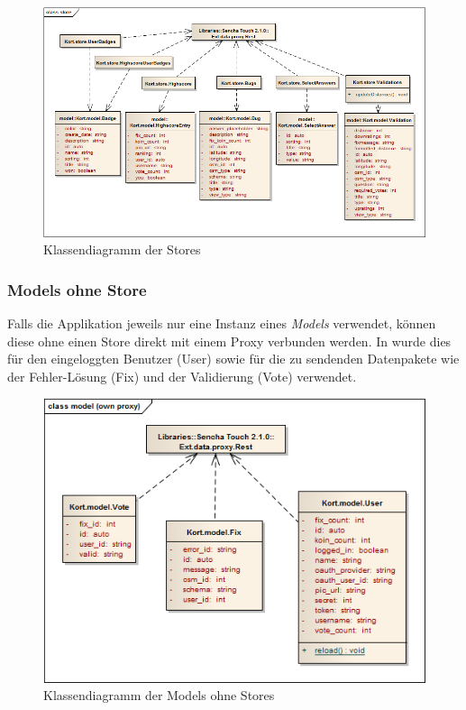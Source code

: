 \begin{figure}[H]
	\centering
	\includegraphics[width=\textwidth]{images/uml/kort-classdiagram-store}
	\caption{Klassendiagramm der Stores}
	\label{image-kort-classdiagram-store}
\end{figure}

\subsubsection{Models ohne Store}

Falls die Applikation jeweils nur eine Instanz eines \emph{Models} verwendet, können diese ohne einen Store direkt mit einem Proxy verbunden werden.
In \kort{} wurde dies für den eingeloggten Benutzer (User) sowie für die zu sendenden Datenpakete wie der Fehler-Lösung (Fix) und der Validierung (Vote) verwendet.

\begin{figure}[H]
	\centering
	\includegraphics[scale=0.6]{images/uml/kort-classdiagram-model_own_proxy}
	\caption{Klassendiagramm der Models ohne Stores}
	\label{image-kort-classdiagram-model_own_proxy}
\end{figure}

